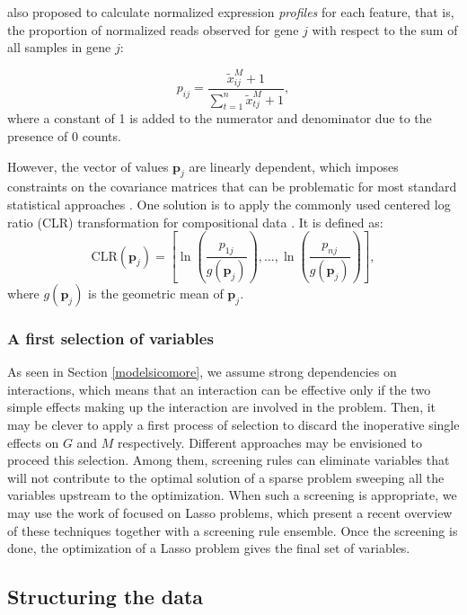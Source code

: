 \documentclass[]{book}
\begin{document}
\citep{rau2017transformation} also proposed to calculate normalized
expression \emph{profiles} for each feature, that is, the proportion of
normalized reads observed for gene \(j\) with respect to the sum of all
samples in gene \(j\):

\[p_{ij} = \frac{\tilde{x}_{ij}^{\mathit{M}} + 1}{\sum_{t=1}^n \tilde{x}_{tj}^{\mathit{M}} + 1},\]
where a constant of 1 is added to the numerator and denominator due to
the presence of 0 counts.

However, the vector of values \(\mathbf{p}_j\) are linearly dependent,
which imposes constraints on the covariance matrices that can be
problematic for most standard statistical approaches
\citep{rau2017transformation}. One solution is to apply the commonly used
centered log ratio (CLR) transformation for compositional data
\citep{Aitchison:JRSSB82}. It is defined as:
\[\text{CLR}(\mathbf{p}_j) = \left[ \ln\left( \frac{p_{1j}}{g(\mathbf{p}_j)}\right) , \dots, 
\ln\left( \frac{p_{nj}}{g(\mathbf{p}_j)}\right)  \right],\] where
\(g(\mathbf{p}_j)\) is the geometric mean of \(\mathbf{p}_j\).

\hypertarget{a-first-selection-of-variables}{%
\subsubsection{A first selection of variables}\label{a-first-selection-of-variables}}

As seen in Section \ref{modelsicomore}, we assume strong
dependencies on interactions, which means that an interaction can be
effective only if the two simple effects making up the interaction are
involved in the problem. Then, it may be clever to apply a first process
of selection to discard the inoperative single effects on \(\mathit{G}\) and
\(\mathit{M}\) respectively. Different approaches may be envisioned to proceed
this selection. Among them, screening rules can eliminate variables that
will not contribute to the optimal solution of a sparse problem sweeping
all the variables upstream to the optimization. When such a screening is
appropriate, we may use the work of \citep{Lee:PAMI17} focused on Lasso
problems, which present a recent overview of these techniques together
with a screening rule ensemble. Once the screening is done, the
optimization of a Lasso problem gives the final set of variables.

\hypertarget{structure}{%
\subsection{Structuring the data}\label{structure}}
\end{document}
